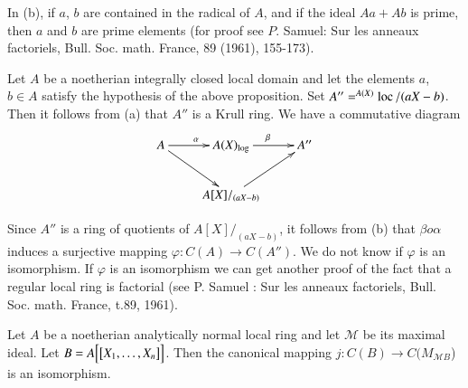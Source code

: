 \begin{rem}%
In (b), if $a$, $b$ are contained in the radical of $A$, and if the
ideal $Aa+ Ab$ is prime, then $a$ and $b$ are prime elements (for
proof see $P$. Samuel: Sur les anneaux factoriels,
Bull. Soc. math. France, 89 (1961),  155-173). 
\end{rem}

\begin{rem} %
Let $A$ be a noetherian integrally closed local domain and let the
elements $a$, $b \in A$ satisfy the hypothesis of the above proposition.  
Set $A'' = ^{A(X)} \operatorname{loc} / (aX-b)$. Then it follows from (a) that
$A''$ is a Krull ring. We have a commutative diagram 
\[
\xymatrix{
A \ar[dr]\ar[r]^{\alpha} & A (X)_{\log} \ar[r]^{\beta} & A''\\
& A[X]/_{(aX-b)} \ar[ur]
}
\]

\noindent
Since $A''$ is a ring of quotients of $A [X]/_{(a X -b)}$, it follows
from (b) that $\beta o \alpha$ induces a surjective mapping
$\varphi : C(A) \rightarrow C(A'')$. We do not know if $\varphi $ is
an isomorphism. If $\varphi$ is an isomorphism we can get another
proof of the fact that a regular local ring is factorial (see
P. Samuel : Sur les anneaux factoriels, Bull. Soc. math. France,
t.89, 1961).  
\end{rem}

\begin{prop}[C.P. Ramanujam] %
Let $A$ be a noetherian analytically normal
      local ring and let $\mathscr{M}$ be its maximal ideal. Let $B =
      A \Big[\big[ X_1 , \ldots ,\break X_n \big]\Big]$. Then the
      canonical mapping $j : C(B) \rightarrow C(M_{\mathscr{M} B}$) is
      an isomorphism. 
\end{prop}  
  
